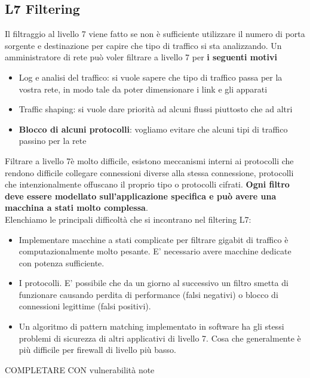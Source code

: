 \documentclass[12pt]{article}
\begin{document}
		\subsection{L7 Filtering}
			Il filtraggio al livello 7 viene fatto se non è sufficiente utilizzare il numero di porta sorgente e destinazione per capire che tipo di traffico si sta analizzando. Un amministratore di rete può voler filtrare a livello 7 per \textbf{i seguenti motivi}
			\begin{itemize}
				\item Log e analisi del traffico: si vuole sapere che tipo di traffico passa per la vostra rete, in modo tale da poter dimensionare i link e gli apparati
				\item Traffic shaping: si vuole dare priorità ad alcuni flussi piuttosto che ad altri
				\item \textbf{Blocco di alcuni protocolli}: vogliamo evitare che alcuni tipi di traffico passino per la rete
			\end{itemize}
			Filtrare a livello 7è molto difficile, esistono meccanismi interni ai protocolli che rendono difficile collegare connessioni diverse alla stessa connessione, protocolli che intenzionalmente offuscano il proprio tipo o protocolli cifrati. \textbf{Ogni filtro deve essere modellato sull'applicazione specifica e può avere una macchina a stati molto complessa}. \\
			Elenchiamo le principali difficoltà che si incontrano nel filtering L7:
			\begin{itemize}
				\item Implementare macchine a stati complicate per filtrare gigabit di traffico è computazionalmente molto pesante. E’ necessario avere macchine
				dedicate con potenza sufficiente.
				\item I protocolli. E’ possibile che da un giorno al successivo un filtro smetta di
				funzionare causando perdita di performance (falsi negativi) o blocco di
				connessioni legittime (falsi positivi).
				\item Un algoritmo di pattern matching implementato in software ha gli stessi
				problemi di sicurezza di altri applicativi di livello 7. Cosa che
				generalmente è più difficile per firewall di livello più basso.
			\end{itemize} 
			
			COMPLETARE CON vulnerabilità note \\
			
			
				
				
				
				
				
				
				
				
				
				
			
		
			
			
			
				
				
				
				
				
			
			
		
		
		
				
				
				
		
			
			
				
			
			
			
			 
						
		
		
		
			
		
				 
\end{document}
